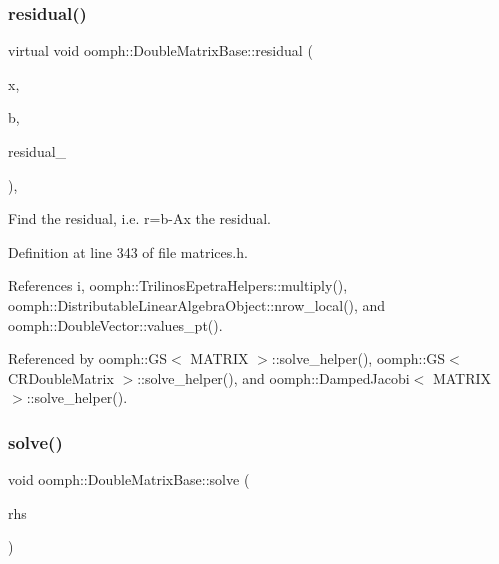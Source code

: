\subsubsection{\texorpdfstring{residual()}{residual()}}
{\footnotesize\ttfamily virtual void oomph\+::\+Double\+Matrix\+Base\+::residual (\begin{DoxyParamCaption}\item[{const \hyperlink{classoomph_1_1DoubleVector}{Double\+Vector} \&}]{x,  }\item[{const \hyperlink{classoomph_1_1DoubleVector}{Double\+Vector} \&}]{b,  }\item[{\hyperlink{classoomph_1_1DoubleVector}{Double\+Vector} \&}]{residual\+\_\+ }\end{DoxyParamCaption})\hspace{0.3cm}{\ttfamily [inline]}, {\ttfamily [virtual]}}



Find the residual, i.\+e. r=b-\/\+Ax the residual. 



Definition at line 343 of file matrices.\+h.



References i, oomph\+::\+Trilinos\+Epetra\+Helpers\+::multiply(), oomph\+::\+Distributable\+Linear\+Algebra\+Object\+::nrow\+\_\+local(), and oomph\+::\+Double\+Vector\+::values\+\_\+pt().



Referenced by oomph\+::\+G\+S$<$ M\+A\+T\+R\+I\+X $>$\+::solve\+\_\+helper(), oomph\+::\+G\+S$<$ C\+R\+Double\+Matrix $>$\+::solve\+\_\+helper(), and oomph\+::\+Damped\+Jacobi$<$ M\+A\+T\+R\+I\+X $>$\+::solve\+\_\+helper().

\mbox{\label{classoomph_1_1DoubleMatrixBase_a4d445c4a1204da569f40ec1bdace9ef3}} 
\subsubsection{\texorpdfstring{solve()}{solve()}\hspace{0.1cm}{\footnotesize\ttfamily [1/4]}}
{\footnotesize\ttfamily void oomph\+::\+Double\+Matrix\+Base\+::solve (\begin{DoxyParamCaption}\item[{\hyperlink{classoomph_1_1DoubleVector}{Double\+Vector} \&}]{rhs }\end{DoxyParamCaption})}



